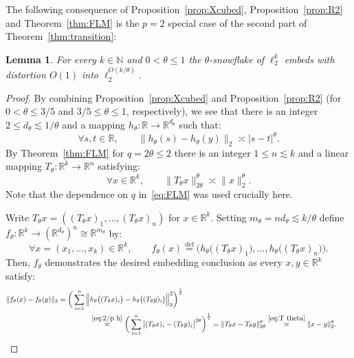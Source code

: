 \documentclass[11pt,reqno]{amsart}
\newtheorem{lemma}[theorem]{Lemma}
\newcommand{\R}{\mathbb{R}}
\newcommand{\N}{\mathbb{N}}
\renewcommand{\le}{\leqslant}
\newcommand{\eqdef}{\stackrel{\mathrm{def}}{=}}
\newcommand{\1}{\mathbf{1}}
\begin{document}
The following consequence of Proposition~\ref{prop:Xcubed}, Proposition~\ref{prop:R2} and Theorem~\ref{thm:FLM} is the  $p=2$ special case of the second part of Theorem~\ref{thm:transition}: 

\begin{lemma}\label{cor:euclidean arbitrary snowflake} For every $k\in \N$ and $0<\theta\le 1$ the $\theta$-snowflake of $\ell_2^k$ embeds with distortion $O(1)$ into $\ell_2^{O(k/\theta)}$.  
\end{lemma}


\begin{proof} By combining Proposition~\ref{prop:Xcubed} and Proposition~\ref{prop:R2} (for  $0<\theta\le 3/5$ and $3/5\le \theta\le 1$, respectively), we see that there is an integer  $2\le d_\theta\lesssim 1/\theta$ and a mapping $h_\theta:\R\to \R^{d_\theta}$ such that: 
\begin{equation}\label{eq:2/p h}
\forall s,t\in \R,\qquad \|h_{\theta}(s)-h_\theta (y)\|_2\asymp |s-t|^{\theta}. 
\end{equation}
By  Theorem~\ref{thm:FLM} for $q=2\theta\le 2$ there is an integer $1\le n\lesssim k$ and a  linear mapping $T_\theta: \R^k\to \R^n$ satisfying:
\begin{equation}\label{eq:T theta}
\forall x\in \R^k,\qquad \|T_\theta x\|_{2\theta}^\theta\asymp \|x\|_2^\theta. 
\end{equation}
Note that the dependence on $q$ in~\eqref{eq:FLM} was used crucially here. 

Write $T_\theta x=((T_\theta x)_1,\ldots,(T_\theta x)_n)$ for  $x\in \R^k$. Setting  $m_\theta= nd_\theta\lesssim k/\theta$ define  $f_\theta:\R^k\to (\R^{d_\theta})^n\cong \R^{m_\theta}$ by:
\begin{equation}\label{eq:def f theta}
\forall x=(x_1,\ldots,x_k)\in \R^k,\qquad f_\theta(x)\eqdef \Big(h_\theta\big((T_\theta x)_1\big),\dots,h_\theta \big((T_\theta x)_n\big)\Big).
\end{equation}
Then, $f_\theta$ demonstrates the desired embedding conclusion as every $x,y\in \R^k$ satisfy:
\begin{align*}
\|f_\theta(x)-f_\theta(y)\|_2=\bigg(\sum_{i=1}^n \Big\|&h_\theta\big((T_\theta x)_i\big)-h_\theta\big((T_\theta y)_i\big)\Big\|_2^2\bigg)^{\frac12}\\&\stackrel{\eqref{eq:2/p h}}{\asymp} \bigg(\sum_{i=1}^n \big|(T_\theta x)_i-(T_\theta y)_i\big|^{2\theta}\bigg)^{\frac12}=\|T_\theta x-T_\theta y\|_{2\theta}^\theta\stackrel{\eqref{eq:T theta}}{\asymp} \|x-y\|_2^\theta. \tag*{\qedhere}
\end{align*}
\end{proof}
\end{document}
